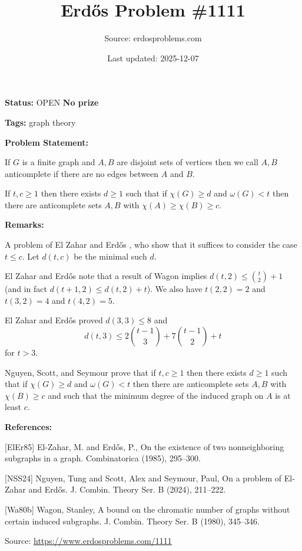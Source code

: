 \documentclass{article}
\title{Erd\H{o}s Problem \#1111}
\date{Last updated: 2025-12-07}
\author{Source: erdosproblems.com}
\begin{document}
\maketitle

\noindent\textbf{Status:} OPEN \quad \textbf{No prize}

\noindent\textbf{Tags:} graph theory

\medskip
\noindent\textbf{Problem Statement:}

If $G$ is a finite graph and $A,B$ are disjoint sets of vertices then we call $A,B$ anticomplete if there are no edges between $A$ and $B$.

If $t,c\geq 1$ then there exists $d\geq 1$ such that if $\chi(G)\geq d$ and $\omega(G)<t$ then there are anticomplete sets $A,B$ with $\chi(A)\geq \chi(B)\geq c$.

\bigskip
\noindent\textbf{Remarks:}

A problem of El Zahar and Erd\H{o}s \cite{ElEr85}, who show that it suffices to consider the case $t\leq c$. Let $d(t,c)$ be the minimal such $d$.

El Zahar and Erd\H{o}s note that a result of Wagon \cite{Wa80b} implies $d(t,2)\leq \binom{t}{2}+1$ (and in fact $d(t+1,2)\leq d(t,2)+t$). We also have $t(2,2)=2$ and $t(3,2)=4$ and $t(4,2)=5$.

El Zahar and Erd\H{o}s proved $d(3,3)\leq 8$ and\[d(t,3) \leq 2\binom{t-1}{3}+7\binom{t-1}{2}+t\]for $t>3$.

Nguyen, Scott, and Seymour \cite{NSS24} prove that if $t,c\geq 1$ then there exists $d\geq 1$ such that if $\chi(G)\geq d$ and $\omega(G)<t$ then there are anticomplete sets $A,B$ with $\chi(B)\geq c$ and such that the minimum degree of the induced graph on $A$ is at least $c$.

\bigskip
\noindent\textbf{References:}

[ElEr85] El-Zahar, M. and Erd\H{o}s, P., On the existence of two nonneighboring subgraphs in a graph. Combinatorica (1985), 295--300.
 
 [NSS24] Nguyen, Tung and Scott, Alex and Seymour, Paul, On a problem of {E}l-{Z}ahar and {E}rd\H{o}s. J. Combin. Theory Ser. B (2024), 211--222.
 
 [Wa80b] Wagon, Stanley, A bound on the chromatic number of graphs without certain
induced subgraphs. J. Combin. Theory Ser. B (1980), 345--346.

\bigskip
\noindent\small{Source: \url{https://www.erdosproblems.com/1111}}
\end{document}
